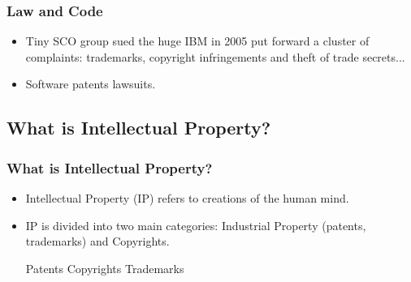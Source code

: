 

\begin{frame}
\frametitle{Law and Code}

\begin{itemize}
\item Tiny SCO group sued the huge IBM in 2005 put forward a cluster of complaints: trademarks, copyright infringements and theft of trade secrets...
\item Software patents lawsuits. 
\end{itemize}

\end{frame}





\subsection{What is Intellectual Property?}
\begin{frame}
\frametitle{What is Intellectual Property?}

\begin{itemize}
\item Intellectual Property (IP) refers to creations of the human mind.
\item IP is divided into two main categories: \alert{Industrial Property} (patents, trademarks) and \alert{Copyrights}.  

\vspace{1cm}

\begin{center}
{\large \alert{Patents}} \hspace{1.2cm}	{\LARGE \alert{Copyrights}} \hspace{1.2cm} 
{\large \alert{Trademarks}}
\end{center}

\end{itemize}

\end{frame}

